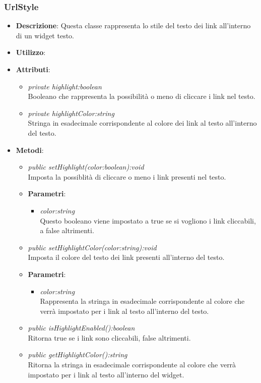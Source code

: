 \subsubsection{UrlStyle}
\begin{itemize}
\item \textbf{Descrizione}: Questa classe rappresenta lo stile del testo dei link all'interno di un widget testo.
\item \textbf{Utilizzo}:
\item \textbf{Attributi}:
	\begin{itemize}
	\item \textit{private highlight:boolean}\\
	Booleano che rappresenta la possibilità o meno di cliccare i link nel testo.
	\item \textit{private highlightColor:string}\\
	Stringa in esadecimale corrispondente al colore dei link al testo all'interno del testo.
	\end{itemize}
\item \textbf{Metodi}:
	\begin{itemize}
	\item \textit{public setHighlight(color:boolean):void}\\
	Imposta la possiblità di cliccare o meno i link presenti nel testo.
		\item{\textbf{Parametri}: \begin{itemize}
		\item \textit{color:string}\\
		Questo booleano viene impostato a true se si vogliono i link cliccabili, a false altrimenti.
		\end{itemize}}
	\item \textit{public setHighlightColor(color:string):void}\\
	Imposta il colore del testo dei link presenti all'interno del testo.
		\item{\textbf{Parametri}: \begin{itemize}
		\item \textit{color:string}\\
		Rappresenta la stringa in esadecimale corrispondente al colore che verrà impostato per i link al testo all'interno del testo.
		\end{itemize}}
	\item \textit{public isHighlightEnabled():boolean}\\
	Ritorna true se i link sono cliccabili, false altrimenti.
	\item \textit{public getHighlightColor():string}\\
	Ritorna la stringa in esadecimale corrispondente al colore che verrà impostato per i link al testo all'interno del widget.
	\end{itemize}
\end{itemize}

